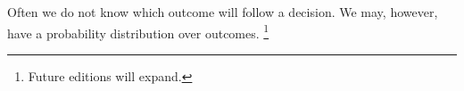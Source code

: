 

Often we do not know which outcome will follow a decision.
We may, however, have a probability distribution over outcomes.
  \ifhmode\unskip\fi\footnote{
Future editions will expand.
  }

\blankpage
